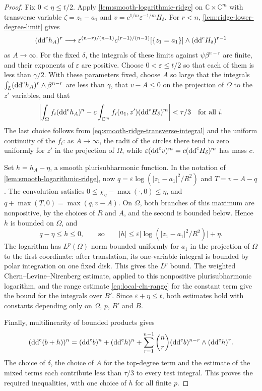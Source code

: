 \begin{proof}
Fix $0<\eta\leq t/2$. Apply \cref{lem:smooth-logarithmic-ridge} on $\mathbb C\times\mathbb C^m$ with transverse variable $\zeta=z_1-a_1$ and $v=c^{1/m}\varepsilon^{-1/m}H_\delta$. For $r<n$, \cref{lem:ridge-lower-degree-limit} gives
\[
 (\mathrm{dd}^{\mathrm{c}} h_A)^r\longrightarrow
 \varepsilon^{(n-r)/(n-1)}c^{(r-1)/(n-1)}
               [\{z_1=a_1\}]\wedge(\mathrm{dd}^{\mathrm{c}} H_\delta)^{r-1}
\]
as $A\to\infty$. For the fixed $\delta$, the integrals of these limits against $\psi\beta^{n-r}$ are finite, and their exponents of $\varepsilon$ are positive. Choose $0<\varepsilon\leq t/2$ so that each of them is less than $\gamma/2$. With these parameters fixed, choose $A$ so large that the integrals $\int_L(\mathrm{dd}^{\mathrm{c}} h_A)^r\wedge\beta^{n-r}$ are less than $\gamma$, that $v-A\leq0$ on the projection of $\Omega$ to the $z'$ variables, and that
\[
 \left|\int_\Omega f_i(\mathrm{dd}^{\mathrm{c}} h_A)^n
   -c\int_{\mathbb C^m}f_i(a_1,z')(\mathrm{dd}^{\mathrm{c}} H_\delta)^m\right|<\tau/3
 \quad\text{for all }i.
\]
The last choice follows from \eqref{eq:smooth-ridge-transverse-integral} and the uniform continuity of the $f_i$: as $A\to\infty$, the radii of the circles there tend to zero uniformly for $z'$ in the projection of $\Omega$, while $\varepsilon(\mathrm{dd}^{\mathrm{c}} v)^m=c(\mathrm{dd}^{\mathrm{c}} H_\delta)^m$ has mass $c$.

Set $h=h_A-\eta$, a smooth plurisubharmonic function. In the notation of \cref{lem:smooth-logarithmic-ridge}, now $q=\varepsilon\log(|z_1-a_1|^2/R^2)$ and $T=v-A-q$. The convolution satisfies $0\leq\chi_\eta-\max(\cdot,0)\leq\eta$, and $q+\max(T,0)=\max(q,v-A)$. On $\Omega$, both branches of this maximum are nonpositive, by the choices of $R$ and $A$, and the second is bounded below. Hence $h$ is bounded on $\Omega$, and
\[
 q-\eta\leq h\leq0,
 \qquad\text{so}\qquad
 |h|\leq\varepsilon\bigl|\log(|z_1-a_1|^2/R^2)\bigr|+\eta.
\]
The logarithm has $L^p(\Omega)$ norm bounded uniformly for $a_1$ in the projection of $\Omega$ to the first coordinate: after translation, its one-variable integral is bounded by polar integration on one fixed disk. This gives the $L^p$ bound. The weighted Chern--Levine--Nirenberg estimate, applied to this nonpositive plurisubharmonic logarithm, and the range estimate \eqref{eq:local-cln-range} for the constant term give the bound for the integrals over $B'$. Since $\varepsilon+\eta\leq t$, both estimates hold with constants depending only on $\Omega$, $p$, $B'$ and $B$.

Finally, multilinearity of bounded products gives
\[
 (\mathrm{dd}^{\mathrm{c}}(b+h))^n=(\mathrm{dd}^{\mathrm{c}} b)^n+(\mathrm{dd}^{\mathrm{c}} h)^n
       +\sum_{r=1}^{n-1}\binom nr
                     (\mathrm{dd}^{\mathrm{c}} b)^{n-r}\wedge(\mathrm{dd}^{\mathrm{c}} h)^r.
\]
The choice of $\delta$, the choice of $A$ for the top-degree term and the estimate of the mixed terms each contribute less than $\tau/3$ to every test integral. This proves the required inequalities, with one choice of $h$ for all finite $p$.
\end{proof}

